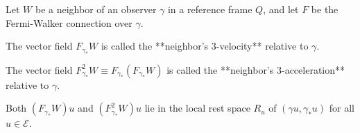 Let $W$ be a neighbor of an observer $\gamma$ in a reference frame $Q$, and let $F$ be the Fermi-Walker connection over $\gamma$.

The vector field $F_{\gamma_*} W$ is called the **neighbor's 3-velocity** relative to $\gamma$.

The vector field $F_{\gamma_*}^2 W \equiv F_{\gamma_*} (F_{\gamma_*} W)$ is called the **neighbor's 3-acceleration** relative to $\gamma$.

Both $(F_{\gamma_*} W)u$ and $(F_{\gamma_*}^2 W)u$ lie in the local rest space $R_u$ of $(\gamma u, \gamma_* u)$ for all $u \in \mathcal{E}$.
